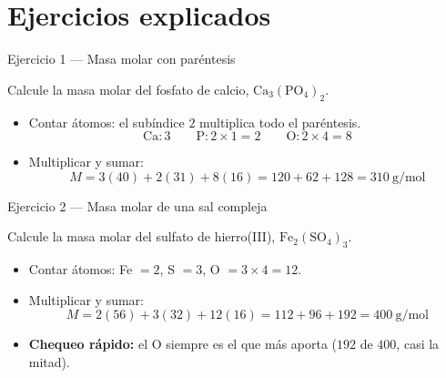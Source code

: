 \documentclass[aspectratio=169]{beamer}
\begin{document}
\section{Ejercicios explicados}

\begin{frame}{Ejercicio 1 — Masa molar con paréntesis}
  \mwtopanchoroff
  \begin{mwejercicio}
    Calcule la masa molar del fosfato de calcio, $\text{Ca}_3(\text{PO}_4)_2$.
  \end{mwejercicio}
  \vspace{2pt}
  \begin{mwpasos}[Resolución]
    \begin{itemize}
      \item Contar átomos: el subíndice $2$ multiplica todo el paréntesis.
            \[
              \text{Ca}:3 \qquad \text{P}:2\times1 = 2 \qquad \text{O}:2\times4 = 8
            \]
      \item Multiplicar y sumar:
            \[
              M = 3(40) + 2(31) + 8(16) = 120 + 62 + 128 = \boxed{310\ \text{g/mol}}
            \]
    \end{itemize}
  \end{mwpasos}
  \mwtopanchoron
\end{frame}

\begin{frame}{Ejercicio 2 — Masa molar de una sal compleja}
  \mwtopanchoroff
  \begin{mwejercicio}
    Calcule la masa molar del sulfato de hierro(III), $\text{Fe}_2(\text{SO}_4)_3$.
  \end{mwejercicio}
  \vspace{2pt}
  \begin{mwpasos}[Resolución]
    \begin{itemize}
      \item Contar átomos: Fe $=2$, S $=3$, O $=3\times4 = 12$.
      \item Multiplicar y sumar:
            \[
              M = 2(56) + 3(32) + 12(16) = 112 + 96 + 192 = \boxed{400\ \text{g/mol}}
            \]
      \item \textbf{Chequeo rápido:} el O siempre es el que más aporta
            ($192$ de $400$, casi la mitad).
    \end{itemize}
  \end{mwpasos}
  \mwtopanchoron
\end{frame}
\end{document}
